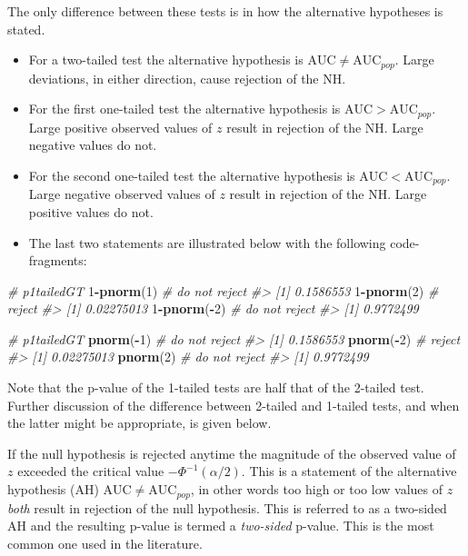 \documentclass[
]{book}
\newenvironment{Shaded}{\begin{snugshade}}{\end{snugshade}}
\newcommand{\CommentTok}[1]{\textcolor[rgb]{0.56,0.35,0.01}{\textit{#1}}}
\newcommand{\DecValTok}[1]{\textcolor[rgb]{0.00,0.00,0.81}{#1}}
\newcommand{\KeywordTok}[1]{\textcolor[rgb]{0.13,0.29,0.53}{\textbf{#1}}}
\newcommand{\NormalTok}[1]{#1}
\newcommand{\OperatorTok}[1]{\textcolor[rgb]{0.81,0.36,0.00}{\textbf{#1}}}
\providecommand{\tightlist}{%
  \setlength{\itemsep}{0pt}\setlength{\parskip}{0pt}}
\begin{document}
The only difference between these tests is in how the alternative hypotheses is stated.

\begin{itemize}
\tightlist
\item
  For a two-tailed test the alternative hypothesis is \(\text{AUC} \ne \text{AUC}_{pop}\). Large deviations, in either direction, cause rejection of the NH.
\item
  For the first one-tailed test the alternative hypothesis is \(\text{AUC} > \text{AUC}_{pop}\). Large positive observed values of \(z\) result in rejection of the NH. Large negative values do not.
\item
  For the second one-tailed test the alternative hypothesis is \(\text{AUC} < \text{AUC}_{pop}\). Large negative observed values of \(z\) result in rejection of the NH. Large positive values do not.
\item
  The last two statements are illustrated below with the following code-fragments:
\end{itemize}

\begin{Shaded}
\begin{Highlighting}[]
\CommentTok{# p1tailedGT}
\DecValTok{1}\OperatorTok{-}\KeywordTok{pnorm}\NormalTok{(}\DecValTok{1}\NormalTok{) }\CommentTok{# do not reject}
\CommentTok{#> [1] 0.1586553}
\DecValTok{1}\OperatorTok{-}\KeywordTok{pnorm}\NormalTok{(}\DecValTok{2}\NormalTok{) }\CommentTok{# reject}
\CommentTok{#> [1] 0.02275013}
\DecValTok{1}\OperatorTok{-}\KeywordTok{pnorm}\NormalTok{(}\OperatorTok{-}\DecValTok{2}\NormalTok{) }\CommentTok{# do not reject}
\CommentTok{#> [1] 0.9772499}

\CommentTok{# p1tailedGT}
\KeywordTok{pnorm}\NormalTok{(}\OperatorTok{-}\DecValTok{1}\NormalTok{) }\CommentTok{# do not reject}
\CommentTok{#> [1] 0.1586553}
\KeywordTok{pnorm}\NormalTok{(}\OperatorTok{-}\DecValTok{2}\NormalTok{) }\CommentTok{# reject}
\CommentTok{#> [1] 0.02275013}
\KeywordTok{pnorm}\NormalTok{(}\DecValTok{2}\NormalTok{) }\CommentTok{# do not reject}
\CommentTok{#> [1] 0.9772499}
\end{Highlighting}
\end{Shaded}

Note that the p-value of the 1-tailed tests are half that of the 2-tailed test. Further discussion of the difference between 2-tailed and 1-tailed tests, and when the latter might be appropriate, is given below.

If the null hypothesis is rejected anytime the magnitude of the observed value of \(z\) exceeded the critical value \(-\Phi^{-1}\left ( {\alpha/2} \right)\). This is a statement of the alternative hypothesis (AH) \(\text{AUC}\neq \text{AUC}_{pop}\), in other words too high or too low values of \(z\) \emph{both} result in rejection of the null hypothesis. This is referred to as a two-sided AH and the resulting p-value is termed a \emph{two-sided} p-value. This is the most common one used in the literature.
\end{document}
